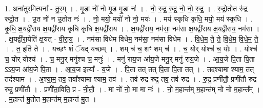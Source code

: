 \documentclass[17pt]{extarticle}
\begin{document}
1. अना॑तुर॒मित्यना᳚ - तु॒र॒म् । . मृ॒डा नो॑ नो मृ॒ड मृ॒डा नः॑ । . नो॒ रु॒द्र॒ रु॒द्र॒ नो॒ नो॒ रु॒द्र॒ । . रु॒द्रो॒तोत रु॑द्र रुद्रो॒त । . उ॒त नो॑ न उ॒तोत नः॑ । . नो॒ मयो॒ मयो॑ नो नो॒ मयः॑ । . मय॑ स्कृधि कृधि॒ मयो॒ मय॑ स्कृधि । . कृ॒धि॒ क्ष॒यद्वी॑राय क्ष॒यद्वी॑राय कृधि कृधि क्ष॒यद्वी॑राय । . क्ष॒यद्वी॑राय॒ नम॑सा॒ नम॑सा क्ष॒यद्वी॑राय क्ष॒यद्वी॑राय॒ नम॑सा । . क्ष॒यद्वी॑रा॒येति॑ क्ष॒यत् - वी॒रा॒य॒ । . नम॑सा विधेम विधेम॒ नम॑सा॒ नम॑सा विधेम । . वि॒धे॒म॒ ते॒ ते॒ वि॒धे॒म॒ वि॒धे॒म॒ ते॒ । . त॒ इति॑ ते । . यच्छꣳ शं ॅयद् यच्छम् । . शम् च॑ च॒ शꣳ शम् च॑ । . च॒ योर् योश्च॑ च॒ योः । . योश्च॑ च॒ योर् योश्च॑ । . च॒ मनु॒र् मनु॑श्च च॒ मनुः॑ । . मनु॑ राय॒ज आ॑य॒जे मनु॒र् मनु॑ राय॒जे । . आ॒य॒जे पि॒ता पि॒ता ऽऽय॒ज आ॑य॒जे पि॒ता । . आ॒य॒ज इत्या᳚ - य॒जे । . पि॒ता तत् तत् पि॒ता पि॒ता तत् । . तद॑श्यामा श्याम॒ तत् तद॑श्याम । . अ॒श्या॒म॒ तव॒ तवा᳚श्यामा श्याम॒ तव॑ । . तव॑ रुद्र रुद्र॒ तव॒ तव॑ रुद्र । . रु॒द्र॒ प्रणी॑तौ॒ प्रणी॑तौ रुद्र रुद्र॒ प्रणी॑तौ । . प्रणी॑ता॒विति॒ प्र - नी॒तौ॒ । . मा नो॑ नो॒ मा मा नः॑ । . नो॒ म॒हान्त॑म् म॒हान्त॑म् नो नो म॒हान्त᳚म् । . म॒हान्त॑ मु॒तोत म॒हान्त॑म् म॒हान्त॑ मु॒त । \newline
\end{document}
